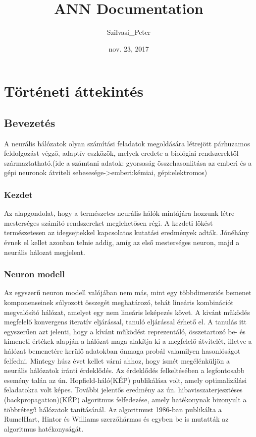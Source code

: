 \documentclass[letterpaper,10pt,magyar]{sphinxmanual}
\title{ANN Documentation}
\date{nov. 23, 2017}
\author{Szilvasi\_Peter}
\begin{document}
\maketitle
\sphinxtableofcontents
{}\label{\detokenize{index::doc}}



\chapter{Történeti áttekintés}
\label{\detokenize{pages/overview::doc}}\label{\detokenize{pages/overview:torteneti-attekintes}}\label{\detokenize{pages/overview:welcome-to-ann-s-documentation}}

\section{Bevezetés}
\label{\detokenize{pages/overview:bevezetes}}
A neurális hálózatok olyan számítási feladatok megoldására létrejött párhuzamos feldolgozást végző, adaptív eszközök, melyek eredete a biológiai rendszerektől származtatható.(ide a számtani adatok: gyorsaság összehasonlitása az emberi és a gépi neuronok átviteli sebesesége-\textgreater{}emberi:kémiai, gépi:elektromos)


\subsection{Kezdet}
\label{\detokenize{pages/overview:kezdet}}
Az alapgondolat, hogy a természetes neurális hálók mintájára hozzunk létre mesterséges számító rendszereket meglehetősen régi. A kezdeti lökést természetesen az idegsejtekkel kapcsolatos kutatási eredmények adták. Jónéhány évnek el kellet azonban telnie addig, amíg az első mesterséges neuron, majd a neurális hálozat megjelent.


\subsection{Neuron modell}
\label{\detokenize{pages/overview:neuron-modell}}
Az egyszerű neuron modell valójában nem más, mint egy többdimenziós bemenet komponenseinek súlyozott összegét meghatározó, tehát lineáris kombinációt megvalósító hálózat, amelyet egy nem lineáris leképezés követ. A kivánt müködés megfelelő konvergens iteratív eljárással, tanuló eljárással érhető el. A tanulás itt egyszerűen azt jelenti, hogy a kívánt működést reprezentáló, összetartozó be- és kimeneti értékek alapján a hálózat maga alakítja ki a megfelelő átvitelét, illetve a hálózat bemenetére kerülő adatokban önmaga probál valamilyen hasonlóságot felfedni.
Mintegy húsz évet kellet várni ahhoz, hogy ismét megélénküljön a neurális hálózatok iránti érdeklődés. Az érdeklődés felkeltésében a legfontosabb esemény talán az ún. Hopfield-háló(KÉP) publikálása volt, amely optimalizálási feladatokra volt képes. További jelentős eredmény az ún. hibavisszaterjesztéses (backpropagation)(KÉP) algoritmus \sphinxquotedblleft{}felfedezése\sphinxquotedblright{}, amely hatékonynak bizonyult a többrétegű hálózatok tanításánál. Az algoritmust 1986-ban publikálta a RumelHart, Hintor és Williams szerzőhármas és egyben be is mutatták az algoritmus hatékonyságát.
\end{document}
